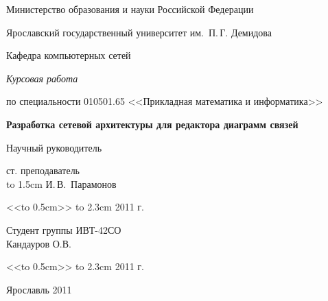 \thispagestyle{empty}

\enlargethispage{2cm}
{
\begin{center}
\renewcommand{\baselinestretch}{1.25}
{
\selectfont
Министерство образования и науки Российской Федерации

Ярославский государственный университет им.~П.\,Г. Демидова

Кафедра компьютерных сетей

\vspace{6cm}

{\em Курсовая работа}

по специальности 010501.65 <<Прикладная математика и информатика>>

\vspace{0.5cm}

{ \Large \bf Разработка сетевой архитектуры для редактора диаграмм связей}

\vspace{3cm}

\hfill\parbox{7cm}
{ 
Научный руководитель

ст. преподаватель\\
\hbox to 1.5cm{\hrulefill} И.\,В.~Парамонов

<<\hbox to 0.5cm{\hrulefill}>> \hbox to 2.3cm{\hrulefill} 2011 г.
}

\vspace{1.5cm}

\hfill\parbox{7cm}
{ 
Студент группы ИВТ-42СО\\
Кандауров О.В.

<<\hbox to 0.5cm{\hrulefill}>> \hbox to 2.3cm{\hrulefill} 2011 г.
}

\vspace{5cm}

Ярославль 2011
}
\end{center}
}

\newpage